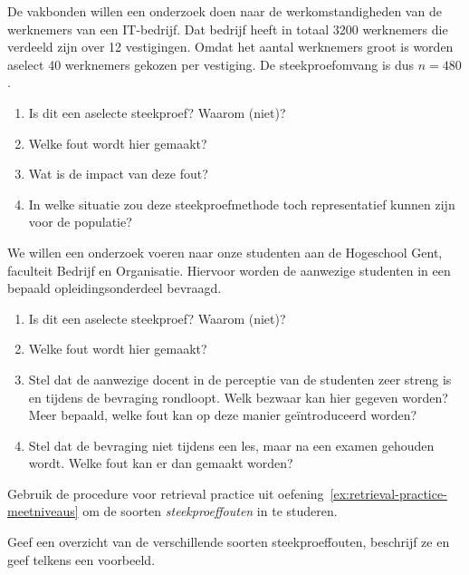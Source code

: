 \begin{exercise}
    De vakbonden willen een onderzoek doen naar de werkomstandigheden van de werknemers van een IT-bedrijf. Dat bedrijf heeft in totaal 3200 werknemers die verdeeld zijn over 12 vestigingen. Omdat het aantal werknemers groot is worden aselect 40 werknemers gekozen per vestiging. De steekproefomvang is dus $n = 480$.
    
    \begin{enumerate}[label=\alph*.]
        \item Is dit een aselecte steekproef? Waarom (niet)?
        \item Welke fout wordt hier gemaakt?
        \item Wat is de impact van deze fout?
        \item In welke situatie zou deze steekproefmethode toch representatief kunnen zijn voor de populatie?
    \end{enumerate}
\end{exercise}

\begin{exercise}
    We willen een onderzoek voeren naar onze studenten aan de Hogeschool Gent, faculteit Bedrijf en Organisatie. Hiervoor worden de aanwezige studenten in een bepaald opleidingsonderdeel bevraagd.
    
    \begin{enumerate}[label=\alph*.]
        \item Is dit een aselecte steekproef? Waarom (niet)?
        \item Welke fout wordt hier gemaakt?
        \item Stel dat de aanwezige docent in de perceptie van de studenten zeer streng is en tijdens de bevraging rondloopt. Welk bezwaar kan hier gegeven worden? Meer bepaald, welke fout kan op deze manier ge\"introduceerd worden?
        \item Stel dat de bevraging niet tijdens een les, maar na een examen gehouden wordt. Welke fout kan er dan gemaakt worden?
    \end{enumerate}
\end{exercise}

\begin{exercise}
    Gebruik de procedure voor retrieval practice uit oefening~\ref{ex:retrieval-practice-meetniveaus} om de soorten \emph{steekproeffouten} in te studeren.
    
    Geef een overzicht van de verschillende soorten steekproeffouten, beschrijf ze en geef telkens een voorbeeld.
\end{exercise}

